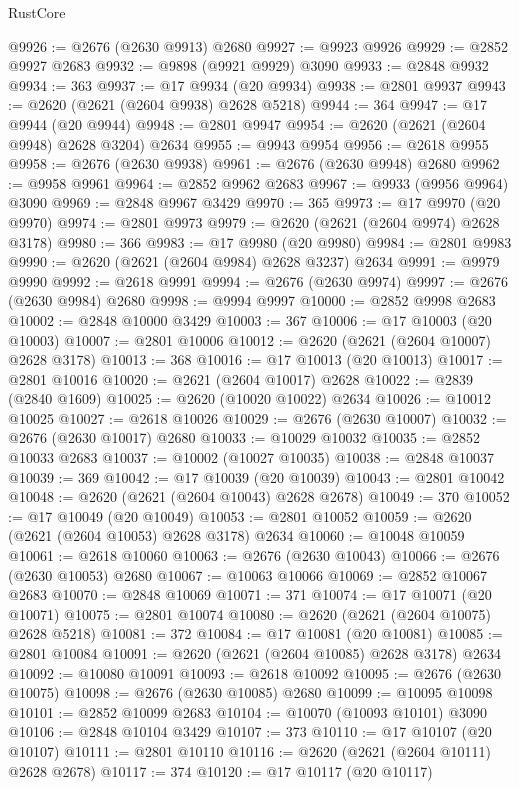 \begin{lexlean}{RustCore}
\begin{coremodule}
@9926 := @2676 (@2630 @9913) @2680
@9927 := @9923 @9926
@9929 := @2852 @9927 @2683
@9932 := @9898 (@9921 @9929) @3090
@9933 := @2848 @9932
@9934 := 363
@9937 := @17 @9934 (@20 @9934)
@9938 := @2801 @9937
@9943 := @2620 (@2621 (@2604 @9938) @2628 @5218)
@9944 := 364
@9947 := @17 @9944 (@20 @9944)
@9948 := @2801 @9947
@9954 := @2620 (@2621 (@2604 @9948) @2628 @3204) @2634
@9955 := @9943 @9954
@9956 := @2618 @9955
@9958 := @2676 (@2630 @9938)
@9961 := @2676 (@2630 @9948) @2680
@9962 := @9958 @9961
@9964 := @2852 @9962 @2683
@9967 := @9933 (@9956 @9964) @3090
@9969 := @2848 @9967 @3429
@9970 := 365
@9973 := @17 @9970 (@20 @9970)
@9974 := @2801 @9973
@9979 := @2620 (@2621 (@2604 @9974) @2628 @3178)
@9980 := 366
@9983 := @17 @9980 (@20 @9980)
@9984 := @2801 @9983
@9990 := @2620 (@2621 (@2604 @9984) @2628 @3237) @2634
@9991 := @9979 @9990
@9992 := @2618 @9991
@9994 := @2676 (@2630 @9974)
@9997 := @2676 (@2630 @9984) @2680
@9998 := @9994 @9997
@10000 := @2852 @9998 @2683
@10002 := @2848 @10000 @3429
@10003 := 367
@10006 := @17 @10003 (@20 @10003)
@10007 := @2801 @10006
@10012 := @2620 (@2621 (@2604 @10007) @2628 @3178)
@10013 := 368
@10016 := @17 @10013 (@20 @10013)
@10017 := @2801 @10016
@10020 := @2621 (@2604 @10017) @2628
@10022 := @2839 (@2840 @1609)
@10025 := @2620 (@10020 @10022) @2634
@10026 := @10012 @10025
@10027 := @2618 @10026
@10029 := @2676 (@2630 @10007)
@10032 := @2676 (@2630 @10017) @2680
@10033 := @10029 @10032
@10035 := @2852 @10033 @2683
@10037 := @10002 (@10027 @10035)
@10038 := @2848 @10037
@10039 := 369
@10042 := @17 @10039 (@20 @10039)
@10043 := @2801 @10042
@10048 := @2620 (@2621 (@2604 @10043) @2628 @2678)
@10049 := 370
@10052 := @17 @10049 (@20 @10049)
@10053 := @2801 @10052
@10059 := @2620 (@2621 (@2604 @10053) @2628 @3178) @2634
@10060 := @10048 @10059
@10061 := @2618 @10060
@10063 := @2676 (@2630 @10043)
@10066 := @2676 (@2630 @10053) @2680
@10067 := @10063 @10066
@10069 := @2852 @10067 @2683
@10070 := @2848 @10069
@10071 := 371
@10074 := @17 @10071 (@20 @10071)
@10075 := @2801 @10074
@10080 := @2620 (@2621 (@2604 @10075) @2628 @5218)
@10081 := 372
@10084 := @17 @10081 (@20 @10081)
@10085 := @2801 @10084
@10091 := @2620 (@2621 (@2604 @10085) @2628 @3178) @2634
@10092 := @10080 @10091
@10093 := @2618 @10092
@10095 := @2676 (@2630 @10075)
@10098 := @2676 (@2630 @10085) @2680
@10099 := @10095 @10098
@10101 := @2852 @10099 @2683
@10104 := @10070 (@10093 @10101) @3090
@10106 := @2848 @10104 @3429
@10107 := 373
@10110 := @17 @10107 (@20 @10107)
@10111 := @2801 @10110
@10116 := @2620 (@2621 (@2604 @10111) @2628 @2678)
@10117 := 374
@10120 := @17 @10117 (@20 @10117)

\end{coremodule}
\end{lexlean}
